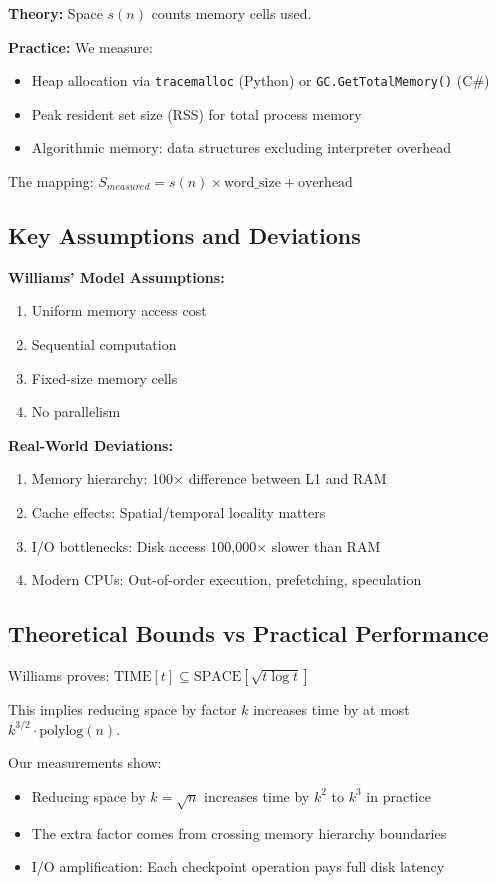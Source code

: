 \documentclass[11pt]{article}
\theoremstyle{definition}
\begin{document}
\textbf{Theory:} Space $s(n)$ counts memory cells used.

\textbf{Practice:} We measure:
\begin{itemize}
\item Heap allocation via \texttt{tracemalloc} (Python) or \texttt{GC.GetTotalMemory()} (C\#)
\item Peak resident set size (RSS) for total process memory
\item Algorithmic memory: data structures excluding interpreter overhead
\end{itemize}

The mapping: $S_{measured} = s(n) \times \text{word\_size} + \text{overhead}$

\subsection{Key Assumptions and Deviations}

\textbf{Williams' Model Assumptions:}
\begin{enumerate}
\item Uniform memory access cost
\item Sequential computation
\item Fixed-size memory cells
\item No parallelism
\end{enumerate}

\textbf{Real-World Deviations:}
\begin{enumerate}
\item Memory hierarchy: 100$\times$ difference between L1 and RAM
\item Cache effects: Spatial/temporal locality matters
\item I/O bottlenecks: Disk access 100,000$\times$ slower than RAM
\item Modern CPUs: Out-of-order execution, prefetching, speculation
\end{enumerate}

\subsection{Theoretical Bounds vs Practical Performance}

Williams proves: $\text{TIME}[t] \subseteq \text{SPACE}[\sqrt{t \log t}]$

This implies reducing space by factor $k$ increases time by at most $k^{3/2} \cdot \text{polylog}(n)$.

Our measurements show:
\begin{itemize}
\item Reducing space by $k = \sqrt{n}$ increases time by $k^2$ to $k^3$ in practice
\item The extra factor comes from crossing memory hierarchy boundaries
\item I/O amplification: Each checkpoint operation pays full disk latency
\end{itemize}
\end{document}
